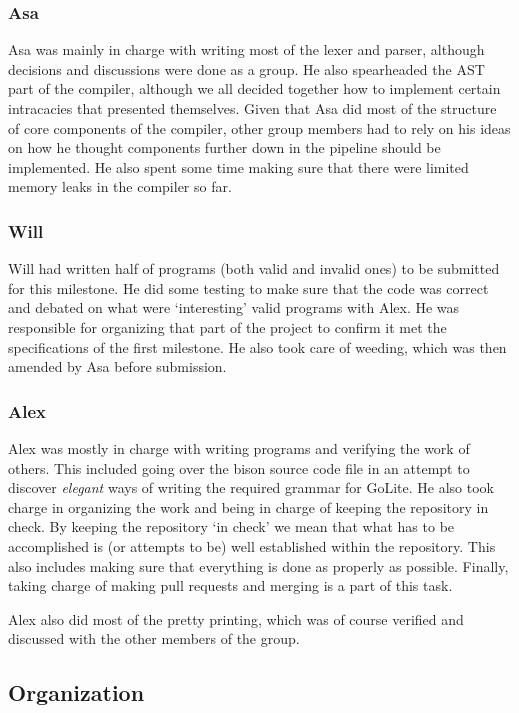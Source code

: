 \documentclass{article}
\begin{document}
\subsubsection{Asa}

Asa was mainly in charge with writing most of the lexer and parser, although
decisions and discussions were done as a group. He also spearheaded the AST part
of the compiler, although we all decided together how to implement certain
intracacies that presented themselves. Given that Asa did most of the structure
of core components of the compiler, other group members had to rely on his ideas
on how he thought components further down in the pipeline should be implemented.
He also spent some time making sure that there were limited memory leaks in
the compiler so far.

\subsubsection{Will}


Will had written half of programs (both valid and invalid ones) to be
submitted for this milestone. He did some testing to make sure that the code was
correct and debated on what were `interesting' valid programs with Alex.
He was responsible for organizing that part of the project to confirm it
met the specifications of the first milestone. He also took care of weeding,
which was then amended by Asa before submission.

\subsubsection{Alex}

Alex was mostly in charge with writing programs and verifying the work of
others. This included going over the bison source code file in an attempt to discover
\textit{elegant} ways of writing the required grammar for GoLite. He also took
charge in organizing the work and being in charge of keeping the repository in check.
By keeping the repository `in check' we mean that what has to be accomplished is
(or attempts to be) well established within the repository. This also includes
making sure that everything is done as properly as possible. Finally, taking charge
of making pull requests and merging is a part of this task.

Alex also did most of the pretty printing, which was of course verified and
discussed with the other members of the group.

\subsection{Organization}
\end{document}
